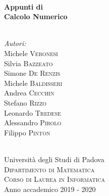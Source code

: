 \documentclass[12pt,a4paper,headings=optiontohead]{scrbook}
\begin{document}
\begin{titlepage}
\HRule \\[0.4cm]
{ \huge \bfseries Appunti di}\\
{ \huge \bfseries Calcolo Numerico\\[0.15 cm]} %
\HRule \\[1.5cm]
 

\begin{minipage}{0.4\textwidth}
\begin{flushleft} \large
\emph{\Large{Autori:}}\\
\quad \quad Michele \textsc{Veronesi}\\
\quad \quad Silvia \textsc{Bazzeato}\\
\quad \quad Simone \textsc{De Renzis}\\
\quad \quad Michele \textsc{Baldisseri}\\
\quad \quad Andrea \textsc{Cecchin}\\
\quad \quad Stefano \textsc{Rizzo}\\
\quad \quad Leonardo \textsc{Tredese}\\
\quad \quad Alessandro \textsc{Pirolo}\\
\quad \quad Filippo \textsc{Pinton}
\end{flushleft}

\end{minipage}\\[3cm]


\LARGE Università degli Studi di Padova\\[0.4cm] %
\textsc{\large Dipartimento di Matematica}\\[0.05cm]
\textsc{\large Corso di Laurea in Informatica}\\[1cm] %

{\Large Anno accademico 2019 - 2020}\\[2cm] %

\vfill %

\end{titlepage}
\end{document}
